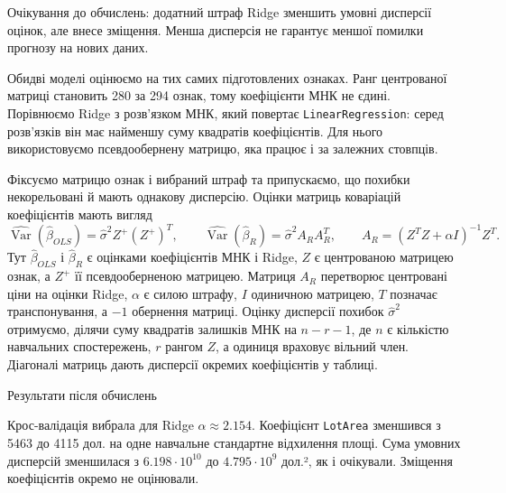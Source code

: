 \answerheading
Очікування до обчислень: додатний штраф Ridge зменшить умовні дисперсії
оцінок, але внесе зміщення. Менша дисперсія не гарантує меншої помилки
прогнозу на нових даних.

Обидві моделі оцінюємо на тих самих підготовлених ознаках. Ранг
центрованої матриці становить 280 за 294 ознак, тому коефіцієнти МНК не
єдині. Порівнюємо Ridge з розв'язком МНК, який повертає
\texttt{LinearRegression}: серед розв'язків він має найменшу суму
квадратів коефіцієнтів. Для нього використовуємо псевдообернену матрицю,
яка працює і за залежних стовпців.

Фіксуємо матрицю ознак і вибраний штраф та припускаємо, що похибки
некорельовані й мають однакову дисперсію. Оцінки матриць коваріацій
коефіцієнтів мають вигляд
\[\widehat{\operatorname{Var}}(\widehat\beta_{OLS})=\widehat\sigma^2 Z^+(Z^+)^T,\qquad
\widehat{\operatorname{Var}}(\widehat\beta_R)=\widehat\sigma^2 A_RA_R^T,\qquad A_R=(Z^TZ+\alpha I)^{-1}Z^T.\]
Тут \(\widehat\beta_{OLS}\) і \(\widehat\beta_R\) є оцінками
коефіцієнтів МНК і Ridge, \(Z\) є центрованою матрицею ознак, а \(Z^+\)
її псевдооберненою матрицею. Матриця \(A_R\) перетворює центровані ціни
на оцінки Ridge, \(\alpha\) є силою штрафу, \(I\) одиничною матрицею,
\(T\) позначає транспонування, а \(-1\) обернення матриці. Оцінку
дисперсії похибок \(\widehat\sigma^2\) отримуємо, ділячи суму квадратів
залишків МНК на \(n-r-1\), де \(n\) є кількістю навчальних спостережень,
\(r\) рангом \(Z\), а одиниця враховує вільний член. Діагоналі матриць
дають дисперсії окремих коефіцієнтів у таблиці.

Результати після обчислень

Крос-валідація вибрала для Ridge \(\alpha\approx2.154\). Коефіцієнт
\texttt{LotArea} зменшився з 5463 до 4115 дол. на одне навчальне
стандартне відхилення площі. Сума умовних дисперсій зменшилася з
\(6.198\cdot10^{10}\) до \(4.795\cdot10^9\) дол.², як і очікували.
Зміщення коефіцієнтів окремо не оцінювали.

